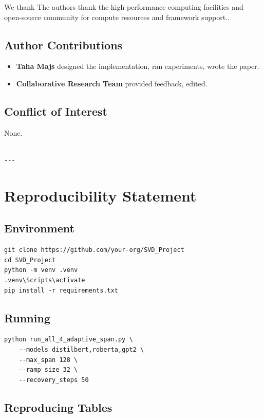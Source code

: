 We thank The authors thank the high-performance computing facilities and open-source community for compute resources and framework support..

\subsection{Author Contributions}

\begin{itemize}
\item \textbf{Taha Majs} designed the implementation, ran experiments, wrote the paper.
\item \textbf{Collaborative Research Team} provided feedback, edited.

\end{itemize}
\subsection{Conflict of Interest}

None.
\begin{lstlisting}

---
\end{lstlisting}


\section{Reproducibility Statement}

\subsection{Environment}

\begin{lstlisting}
git clone https://github.com/your-org/SVD_Project
cd SVD_Project
python -m venv .venv
.venv\Scripts\activate
pip install -r requirements.txt
\end{lstlisting}

\subsection{Running}

\begin{lstlisting}
python run_all_4_adaptive_span.py \
    --models distilbert,roberta,gpt2 \
    --max_span 128 \
    --ramp_size 32 \
    --recovery_steps 50
\end{lstlisting}

\subsection{Reproducing Tables}

